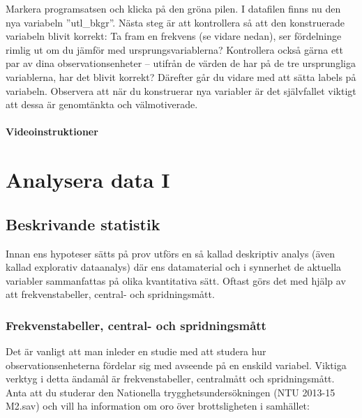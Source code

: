 \documentclass[
]{book}
\begin{document}
Markera programsatsen och klicka på den gröna pilen. I datafilen finns nu den nya variabeln ''utl\_bkgr''. Nästa steg är att kontrollera så att den konstruerade
variabeln blivit korrekt: Ta fram en frekvens (se vidare nedan), ser fördelninge rimlig ut om du jämför
med ursprungsvariablerna? Kontrollera också gärna ett par av dina observationsenheter -- utifrån de
värden de har på de tre ursprungliga variablerna, har det blivit korrekt? Därefter går du vidare med att
sätta labels på variabeln. Observera att när du konstruerar nya variabler är det självfallet viktigt att dessa är genomtänkta och välmotiverade.

\hypertarget{videoinstruktioner-2}{%
\subsection{Videoinstruktioner}\label{videoinstruktioner-2}}

\hypertarget{part-analysera-data-i}{%
\part*{Analysera data I}\label{part-analysera-data-i}}

\hypertarget{beskrivande-statistik}{%
\chapter{Beskrivande statistik}\label{beskrivande-statistik}}

Innan ens hypoteser sätts på prov utförs en så kallad deskriptiv analys (även kallad explorativ dataanalys) där ens datamaterial och i synnerhet de aktuella variabler sammanfattas på olika kvantitativa sätt. Oftast görs det med hjälp av att frekvenstabeller, central- och spridningsmått.

\hypertarget{frekvenstabeller-central--och-spridningsmuxe5tt}{%
\section{Frekvenstabeller, central- och spridningsmått}\label{frekvenstabeller-central--och-spridningsmuxe5tt}}

Det är vanligt att man inleder en studie med att studera hur observationsenheterna fördelar sig med
avseende på en enskild variabel. Viktiga verktyg i detta ändamål är frekvenstabeller, centralmått och
spridningsmått. Anta att du studerar den Nationella trygghetsundersökningen (NTU 2013-15 M2.sav)
och vill ha information om oro över brottsligheten i samhället:
\end{document}
